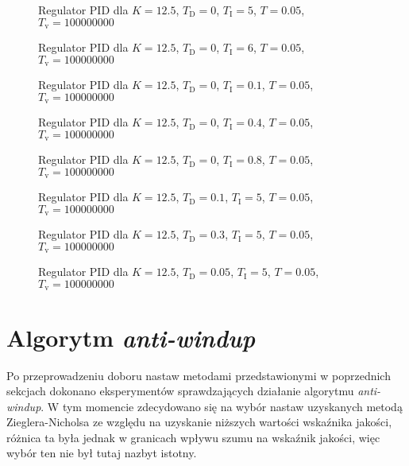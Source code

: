 \begin{figure}[H]
\centering

\caption{Regulator PID dla $K = 12.5$, $T_\mathrm{D} = 0$, $T_\mathrm{I} = 5$, $T = 0.05$, $T_\mathrm{v} = 100000000$}
\label{R3}
\end{figure}

\begin{figure}[H]
\centering

\caption{Regulator PID dla $K = 12.5$, $T_\mathrm{D} = 0$, $T_\mathrm{I} = 6$, $T = 0.05$, $T_\mathrm{v} = 100000000$}
\label{R4}
\end{figure}

\begin{figure}[H]
\centering

\caption{Regulator PID dla $K = 12.5$, $T_\mathrm{D} = 0$, $T_\mathrm{I} = 0.1$, $T = 0.05$, $T_\mathrm{v} = 100000000$}
\label{R5}
\end{figure}

\begin{figure}[H]
\centering

\caption{Regulator PID dla $K = 12.5$, $T_\mathrm{D} = 0$, $T_\mathrm{I} = 0.4$, $T = 0.05$, $T_\mathrm{v} = 100000000$}
\label{R6}
\end{figure}

\begin{figure}[H]
\centering

\caption{Regulator PID dla $K = 12.5$, $T_\mathrm{D} = 0$, $T_\mathrm{I} = 0.8$, $T = 0.05$, $T_\mathrm{v} = 100000000$}
\label{R7}
\end{figure}


\begin{figure}[H]
\centering

\caption{Regulator PID dla $K = 12.5$, $T_\mathrm{D} = 0.1$, $T_\mathrm{I} = 5$, $T = 0.05$, $T_\mathrm{v} = 100000000$}
\label{R8}
\end{figure}

\begin{figure}[H]
\centering

\caption{Regulator PID dla $K = 12.5$, $T_\mathrm{D} = 0.3$, $T_\mathrm{I} = 5$, $T = 0.05$, $T_\mathrm{v} = 100000000$}
\label{R9}
\end{figure}

\begin{figure}[H]
\centering

\caption{Regulator PID dla $K = 12.5$, $T_\mathrm{D} = 0.05$, $T_\mathrm{I} = 5$, $T = 0.05$, $T_\mathrm{v} = 100000000$}
\label{R10}
\end{figure}

\section{Algorytm \textit{anti-windup}}
Po przeprowadzeniu doboru nastaw metodami przedstawionymi w poprzednich sekcjach dokonano eksperymentów sprawdzających działanie algorytmu \textit{anti-windup}. W tym momencie zdecydowano się na wybór nastaw uzyskanych metodą Zieglera-Nicholsa ze względu na uzyskanie niższych wartości wskaźnika jakości, różnica ta była jednak w granicach wpływu szumu na wskaźnik jakości, więc wybór ten nie był tutaj nazbyt istotny.

